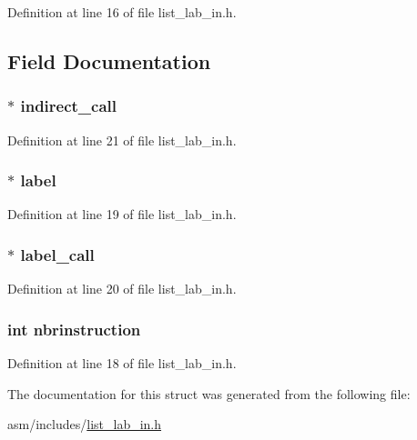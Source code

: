 Definition at line 16 of file list\-\_\-lab\-\_\-in.\-h.



\subsection{Field Documentation}
\hypertarget{structs__latinfo_a2644eca4f289d61e8f2e5923cf5a3a6c}{
\subsubsection[{indirect\-\_\-call}]{$\ast$ indirect\-\_\-call}}\label{structs__latinfo_a2644eca4f289d61e8f2e5923cf5a3a6c}


Definition at line 21 of file list\-\_\-lab\-\_\-in.\-h.

\hypertarget{structs__latinfo_a53b5fc61b57ec971b013fa338a3adfc7}{
\subsubsection[{label}]{$\ast$ label}}\label{structs__latinfo_a53b5fc61b57ec971b013fa338a3adfc7}


Definition at line 19 of file list\-\_\-lab\-\_\-in.\-h.

\hypertarget{structs__latinfo_ab7161df38e24c00cc4f576cec776ea81}{
\subsubsection[{label\-\_\-call}]{$\ast$ label\-\_\-call}}\label{structs__latinfo_ab7161df38e24c00cc4f576cec776ea81}


Definition at line 20 of file list\-\_\-lab\-\_\-in.\-h.

\hypertarget{structs__latinfo_a565ba05926f2219e68cf55a13f15fbab}{
\subsubsection[{nbrinstruction}]{\setlength{\rightskip}{0pt plus 5cm}int nbrinstruction}}\label{structs__latinfo_a565ba05926f2219e68cf55a13f15fbab}


Definition at line 18 of file list\-\_\-lab\-\_\-in.\-h.



The documentation for this struct was generated from the following file\-:\begin{DoxyCompactItemize}
\item 
asm/includes/\hyperlink{list__lab__in_8h}{list\-\_\-lab\-\_\-in.\-h}\end{DoxyCompactItemize}
